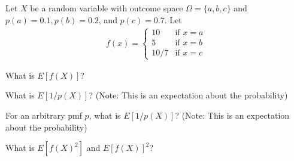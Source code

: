 
Let $X$ be a random variable with outcome space $\Omega=\{a,b,c\}$ and  $p(a)=0.1, p(b)=0.2$, and $p(c)=0.7$. Let 
%
\begin{align*}
f(x)=
\left\{
  \begin{array}{lr}
    10 &  \text{if } x = a\\
    5 &  \text{if } x = b\\
    10/7 & \text{if } x = c
  \end{array}
\right.
\end{align*}

What is $E[f(X)]$?

What is $E[1/p(X)]$? (Note: This is an expectation about the probability)

For an arbitrary pmf $p$, what is $E[1/p(X)]$? (Note: This is an expectation about the probability)

What is $E[f(X)^{2}]$ and $E[f(X)]^{2}$?